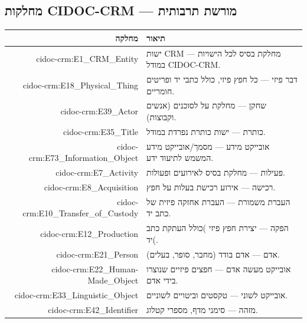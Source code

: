 \documentclass[12pt,a4paper]{article}
\begin{document}
\subsection{מחלקות CIDOC-CRM — מורשת תרבותית}

\begin{longtable}{|r|p{10cm}|}
\hline
\textbf{מחלקה} & \textbf{תיאור} \\
\hline
\endhead

cidoc-crm:E1\_CRM\_Entity & 
ישות CRM — מחלקת בסיס לכל הישויות במודל CIDOC-CRM.\\
\hline

cidoc-crm:E18\_Physical\_Thing & 
דבר פיזי — כל חפץ פיזי, כולל כתבי יד ופריטים חומריים.\\
\hline

cidoc-crm:E39\_Actor & 
שחקן — מחלקת על לסוכנים (אנשים וקבוצות).\\
\hline

cidoc-crm:E35\_Title & 
כותרת — ישות כותרת נפרדת במודל.\\
\hline

cidoc-crm:E73\_Information\_Object & 
אובייקט מידע — מסמך/אובייקט מידע המשמש לתיעוד ידע.\\
\hline

cidoc-crm:E7\_Activity & 
פעילות — מחלקת בסיס לאירועים ופעולות.\\
\hline

cidoc-crm:E8\_Acquisition & 
רכישה — אירוע רכישת בעלות על חפץ.\\
\hline

cidoc-crm:E10\_Transfer\_of\_Custody & 
העברת משמורת — העברת אחזקה פיזית של כתב יד.\\
\hline

cidoc-crm:E12\_Production & 
הפקה — יצירת חפץ פיזי )כולל העתקת כתב יד(.\\
\hline

cidoc-crm:E21\_Person & 
אדם — אדם בודד (מחבר, סופר, בעלים).\\
\hline

cidoc-crm:E22\_Human-Made\_Object & 
אובייקט מעשה אדם — חפצים פיזיים שנוצרו בידי אדם.\\
\hline

cidoc-crm:E33\_Linguistic\_Object & 
אובייקט לשוני — טקסטים וביטויים לשוניים.\\
\hline

cidoc-crm:E42\_Identifier & 
מזהה — סימני מדף, מספרי קטלוג.\\
\hline


\end{longtable}
\end{document}
